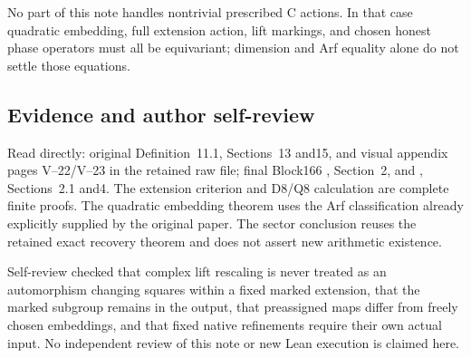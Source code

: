 No part of this note handles nontrivial prescribed C actions. In that
case quadratic embedding, full extension action, lift markings, and
chosen honest phase operators must all be equivariant; dimension and Arf
equality alone do not settle those equations.

\hypertarget{dyadic_markings-evidence-and-author-self-review}{%
\subsection{Evidence and author
self-review}\label{dyadic_markings-evidence-and-author-self-review}}

Read directly: original Definition~11.1, Sections~13 and15, and visual
appendix pages V--22/V--23 in the retained raw file; final Block166
, Section~2, and , Sections~2.1
and4. The extension criterion and D8/Q8 calculation are complete finite
proofs. The quadratic embedding theorem uses the Arf classification
already explicitly supplied by the original paper. The sector conclusion
reuses the retained exact recovery theorem and does not assert new
arithmetic existence.

Self-review checked that complex lift rescaling is never treated as an
automorphism changing squares within a fixed marked extension, that the
marked subgroup remains in the output, that preassigned maps differ from
freely chosen embeddings, and that fixed native refinements require
their own actual input. No independent review of this note or new Lean
execution is claimed here.
